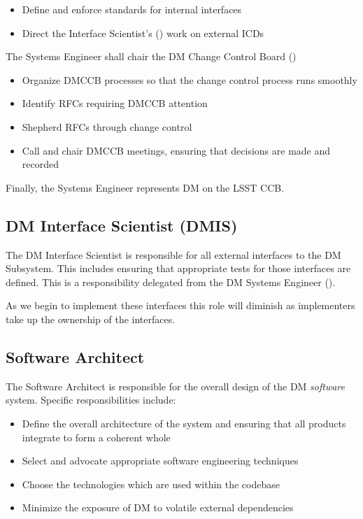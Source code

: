 \begin{itemize}
\item Define and enforce standards for internal interfaces
\item Direct the Interface Scientist's () work on external ICDs
\end{itemize}

The \gls{Systems Engineer} shall chair the \gls{DM} \gls{Change Control Board} ()

\begin{itemize}
\item Organize \gls{DMCCB} processes so that the change control process runs smoothly
\item Identify RFCs requiring \gls{DMCCB} attention
\item Shepherd RFCs through change control
\item Call and chair \gls{DMCCB} meetings, ensuring that decisions are made and recorded
\end{itemize}

Finally, the \gls{Systems Engineer} represents \gls{DM} on the \gls{LSST} \gls{CCB}.

\subsection{DM Interface Scientist (\gls{DMIS}) \label{role:dmis}}

The \gls{DM} Interface Scientist is responsible for all external interfaces to the \gls{DM} \gls{Subsystem}. This includes ensuring that appropriate tests for those interfaces are defined. This is a responsibility delegated from the \gls{DM} \gls{Systems Engineer} ().

As we begin to implement these interfaces this role will diminish as implementers take up the ownership of the interfaces.

\subsection{Software Architect \label{role:softarc}}

The Software Architect is responsible for the overall design of the \gls{DM} \textit{software} system. Specific responsibilities include:

\begin{itemize}

\item{Define the overall architecture of the system and ensuring that all products integrate to form a coherent whole}
\item{Select and advocate appropriate software engineering techniques}
\item{Choose the technologies which are used within the codebase}
\item{Minimize the exposure of \gls{DM} to volatile external dependencies}

\end{itemize}

